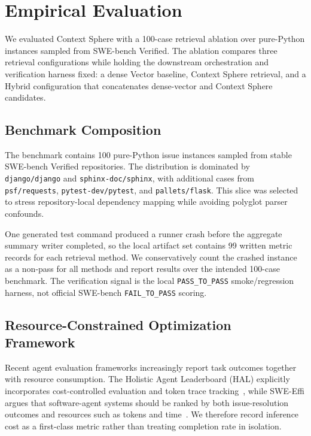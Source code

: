 \section{Empirical Evaluation}
\label{sec:evaluation}

We evaluated Context Sphere with a 100-case retrieval ablation over pure-Python instances sampled from SWE-bench Verified. The ablation compares three retrieval configurations while holding the downstream orchestration and verification harness fixed: a dense Vector baseline, Context Sphere retrieval, and a Hybrid configuration that concatenates dense-vector and Context Sphere candidates.

\subsection{Benchmark Composition}

The benchmark contains 100 pure-Python issue instances sampled from stable SWE-bench Verified repositories. The distribution is dominated by \texttt{django/django} and \texttt{sphinx-doc/sphinx}, with additional cases from \texttt{psf/requests}, \texttt{pytest-dev/pytest}, and \texttt{pallets/flask}. This slice was selected to stress repository-local dependency mapping while avoiding polyglot parser confounds.

One generated test command produced a runner crash before the aggregate summary writer completed, so the local artifact set contains 99 written metric records for each retrieval method. We conservatively count the crashed instance as a non-pass for all methods and report results over the intended 100-case benchmark. The verification signal is the local \texttt{PASS\_TO\_PASS} smoke/regression harness, not official SWE-bench \texttt{FAIL\_TO\_PASS} scoring.

\subsection{Resource-Constrained Optimization Framework}

Recent agent evaluation frameworks increasingly report task outcomes together with resource consumption. The Holistic Agent Leaderboard (HAL) explicitly incorporates cost-controlled evaluation and token trace tracking~\cite{princetonhal2026}, while SWE-Effi argues that software-agent systems should be ranked by both issue-resolution outcomes and resources such as tokens and time~\cite{fan2025sweeffi}. We therefore record inference cost as a first-class metric rather than treating completion rate in isolation.

